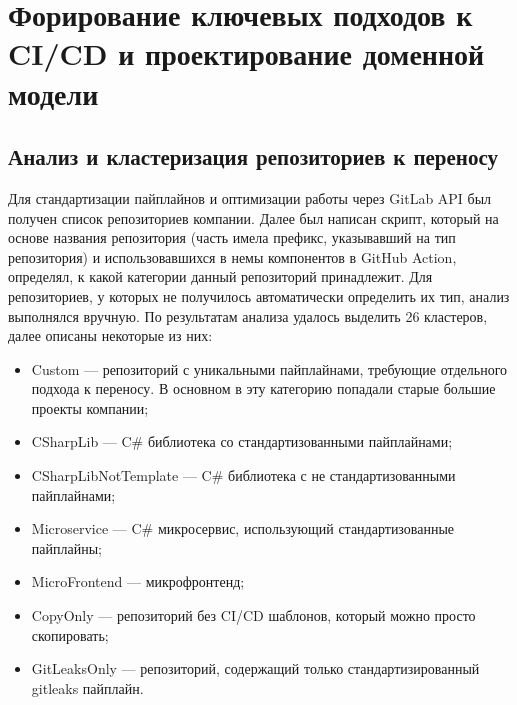 \chapter{Форирование ключевых подходов к CI/CD и проектирование доменной модели} \label{ch:ch2}

\section{Анализ и кластеризация репозиториев к переносу} \label{sec:repository-analysis}
Для стандартизации пайплайнов и оптимизации работы через GitLab API был получен список репозиториев компании.
Далее был написан скрипт,
который на основе названия репозитория (часть имела префикс, указывавший на тип репозитория) и использовавшихся в немы компонентов в GitHub Action,
определял, к какой категории данный репозиторий принадлежит.
Для репозиториев, у которых не получилось автоматически определить их тип, анализ выполнялся вручную.
По результатам анализа удалось выделить 26 кластеров, далее описаны некоторые из них:
\begin{itemize}
  \item Custom — репозиторий с уникальными пайплайнами, требующие отдельного подхода к переносу.
        В основном в эту категорию попадали старые большие проекты компании;
  \item CSharpLib — C\# библиотека со стандартизованными пайплайнами;
  \item CSharpLibNotTemplate — C\# библиотека с не стандартизованными пайплайнами;
  \item Microservice — C\# микросервис, использующий стандартизованные пайплайны;
  \item MicroFrontend — микрофронтенд;
  \item CopyOnly — репозиторий без CI/CD шаблонов, который можно просто скопировать;
  \item GitLeaksOnly — репозиторий, содержащий только стандартизированный gitleaks пайплайн.
\end{itemize}

